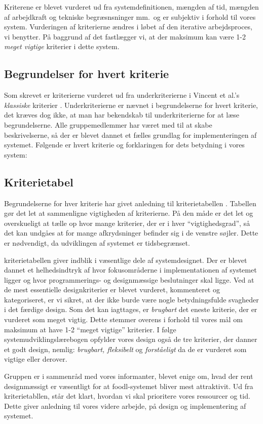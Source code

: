 Kriterene er blevet vurderet ud fra systemdefinitionen, mængden af tid, mængden af arbejdkraft og tekniske begræsnsninger mm.\ og er subjektiv i forhold til vores system. Vurderingen af kriterierne ændres i løbet af den iterative arbejdsproces, vi benytter. På baggrund af det fastlægger vi, at der maksimum kan være 1-2 \emph{meget vigtige} kriterier i dette system.

\subsection{Begrundelser for hvert kriterie}
Som skrevet er kriterierne vurderet ud fra underkriterierne i Vincent et al.'s \emph{klassiske} kriterier \cite[s.~12]{crit}. Underkriterierne er nævnet i begrundelserne for hvert kriterie, det kræves dog ikke, at man har bekendskab til underkriterierne for at læse begrundelserne. Alle gruppemedlemmer har været med til at skabe beskrivelserne, så der er blevet dannet et fælles grundlag for implementeringen af systemet. Følgende er hvert kriterie og forklaringen for dets betydning i vores system:



\subsection{Kriterietabel}
Begrundelserne for hver kriterie har givet anledning til kriterietabellen . Tabellen gør det let at sammenligne vigtigheden af kriterierne. På den måde er det let og overskueligt at tælle op hvor mange kriterier, der er i hver ``vigtighedsgrad'', så det kan undgåes at for mange afkrydsninger befinder sig i de venstre søjler. Dette er nødvendigt, da udviklingen af systemet er tidsbegrænset. 

kriterietabellen giver indblik i væsentlige dele af systemdesignet. Der er blevet dannet et helhedsindtryk af hvor fokusområderne i implementationen af systemet ligger og hvor programmerings- og designmæssige beslutninger skal ligge. Ved at de mest essentielle designkriterier er blevet vurderet, kommenteret og kategoriseret, er vi sikret, at der ikke burde være nogle betydningsfulde svagheder i det færdige design. Som det kan iagttages, er \emph{brugbart} det eneste kriterie, der er vurderet som meget vigtig. Dette stemmer overens i forhold til vores mål om maksimum at have 1-2 ``meget vigtige'' kriterier. I følge systemudviklingslærebogen \cite{ooad} opfylder vores design også de tre kriterier, der danner et godt design, nemlig: \emph{brugbart, fleksibelt} og \emph{forståeligt} da de er vurderet som vigtige eller derover.

Gruppen er i sammenråd med vores informanter, blevet enige om, hvad der rent designmæssigt er væsentligt for at foodl-systemet bliver mest attraktivit. Ud fra kriterietabllen, står det klart, hvordan vi skal prioritere vores ressourcer og tid. Dette giver anledning til vores videre arbejde, på design og implementering af systemet.
